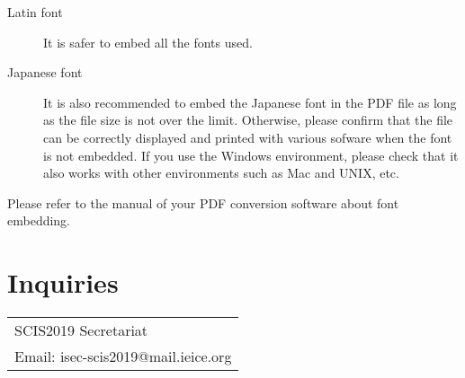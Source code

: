 \documentclass[a4paper]{article}
\begin{document}
\begin{description}
 \item[Latin font]
It is safer to embed all the fonts used.
 \item[Japanese font] It is also recommended to embed the Japanese font in the PDF file as long as the file size is not over the limit.
Otherwise, please confirm that the file can be correctly displayed and printed with various sofware when the font is not embedded.
If you use the Windows environment, please check that it also works with other environments such as Mac and UNIX, etc.
\end{description}

Please refer to the manual of your PDF conversion software about font embedding.

\section{Inquiries}

\begin{tabular}{l}
SCIS2019 Secretariat \\
{\small Email: isec-scis2019@mail.ieice.org} \\
\end{tabular}

\end{document}
